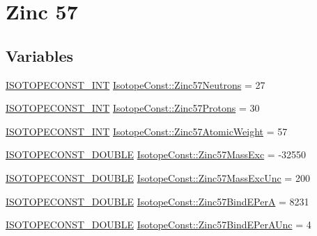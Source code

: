 \hypertarget{group___isotope_const-_zinc-_zn57}{}\section{Zinc 57}
\label{group___isotope_const-_zinc-_zn57}
\subsection*{Variables}
\begin{DoxyCompactItemize}
\item 
\mbox{\hyperlink{group___isotope_const-_macros_ga5f18360b3e99483a35c32d789e62621c}{I\+S\+O\+T\+O\+P\+E\+C\+O\+N\+S\+T\+\_\+\+I\+NT}} \mbox{\hyperlink{group___isotope_const-_zinc-_zn57_gaf8614a2982e84896109acea26d257f91}{Isotope\+Const\+::\+Zinc57\+Neutrons}} = 27
\item 
\mbox{\hyperlink{group___isotope_const-_macros_ga5f18360b3e99483a35c32d789e62621c}{I\+S\+O\+T\+O\+P\+E\+C\+O\+N\+S\+T\+\_\+\+I\+NT}} \mbox{\hyperlink{group___isotope_const-_zinc-_zn57_gaba2e2d47e79d855af98a0ee4ad28c1e5}{Isotope\+Const\+::\+Zinc57\+Protons}} = 30
\item 
\mbox{\hyperlink{group___isotope_const-_macros_ga5f18360b3e99483a35c32d789e62621c}{I\+S\+O\+T\+O\+P\+E\+C\+O\+N\+S\+T\+\_\+\+I\+NT}} \mbox{\hyperlink{group___isotope_const-_zinc-_zn57_gad21f80df3b80521ffa29cb1bd7037881}{Isotope\+Const\+::\+Zinc57\+Atomic\+Weight}} = 57
\item 
\mbox{\hyperlink{group___isotope_const-_macros_ga8f45a7272ce02c0b4c65c44636ed719a}{I\+S\+O\+T\+O\+P\+E\+C\+O\+N\+S\+T\+\_\+\+D\+O\+U\+B\+LE}} \mbox{\hyperlink{group___isotope_const-_zinc-_zn57_gaa0a04fe4728758a63b9d7a47ad83dd01}{Isotope\+Const\+::\+Zinc57\+Mass\+Exc}} = -\/32550
\item 
\mbox{\hyperlink{group___isotope_const-_macros_ga8f45a7272ce02c0b4c65c44636ed719a}{I\+S\+O\+T\+O\+P\+E\+C\+O\+N\+S\+T\+\_\+\+D\+O\+U\+B\+LE}} \mbox{\hyperlink{group___isotope_const-_zinc-_zn57_ga81b9f6afeae768be23dd68808efe7bd1}{Isotope\+Const\+::\+Zinc57\+Mass\+Exc\+Unc}} = 200
\item 
\mbox{\hyperlink{group___isotope_const-_macros_ga8f45a7272ce02c0b4c65c44636ed719a}{I\+S\+O\+T\+O\+P\+E\+C\+O\+N\+S\+T\+\_\+\+D\+O\+U\+B\+LE}} \mbox{\hyperlink{group___isotope_const-_zinc-_zn57_ga2be44f871902f1088fb0a979701fc555}{Isotope\+Const\+::\+Zinc57\+Bind\+E\+PerA}} = 8231
\item 
\mbox{\hyperlink{group___isotope_const-_macros_ga8f45a7272ce02c0b4c65c44636ed719a}{I\+S\+O\+T\+O\+P\+E\+C\+O\+N\+S\+T\+\_\+\+D\+O\+U\+B\+LE}} \mbox{\hyperlink{group___isotope_const-_zinc-_zn57_gab8b3a2d5304c928d37af93cd5ca4d451}{Isotope\+Const\+::\+Zinc57\+Bind\+E\+Per\+A\+Unc}} = 4

\end{DoxyCompactItemize}
